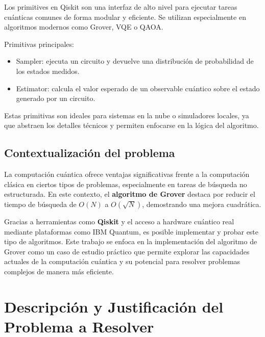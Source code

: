 \documentclass{article}
\begin{document}
Los primitives en Qiskit son una interfaz de alto nivel para ejecutar tareas 
cuánticas comunes de forma modular y eficiente. Se utilizan especialmente en algoritmos 
modernos como Grover, VQE o QAOA.

Primitivas principales:
\begin{itemize}
    \item Sampler: ejecuta un circuito y devuelve una 
            distribución de probabilidad de los estados medidos.
    \item Estimator: calcula el valor esperado de un observable cuántico 
            sobre el estado generado por un circuito.
\end{itemize}

Estas primitivas son ideales para sistemas en la nube o simuladores locales, 
ya que abstraen los detalles técnicos y permiten enfocarse en la lógica del algoritmo.


\subsection{Contextualización del problema}

La computación cuántica ofrece ventajas significativas frente a la computación clásica en ciertos tipos de problemas, especialmente en tareas de búsqueda no estructurada. En este contexto, el \textbf{algoritmo de Grover} destaca por reducir el tiempo de búsqueda de $O(N)$ a $O(\sqrt{N})$, demostrando una mejora cuadrática.

Gracias a herramientas como \textbf{Qiskit} y el acceso a hardware cuántico real mediante plataformas como IBM Quantum, es posible implementar y probar este tipo de algoritmos. Este trabajo se enfoca en la implementación del algoritmo de Grover como un caso de estudio práctico que permite explorar las capacidades actuales de la computación cuántica y su potencial para resolver problemas complejos de manera más eficiente.



\section{Descripción y Justificación del Problema a Resolver}\label{sec:descr}
\end{document}
